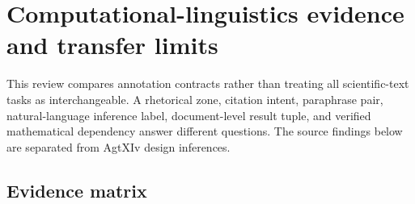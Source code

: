 \section{Computational-linguistics evidence and transfer limits}\label{sec:literature}

This review compares annotation contracts rather than treating all scientific-text tasks as interchangeable. A rhetorical zone, citation intent, paraphrase pair, natural-language inference label, document-level result tuple, and verified mathematical dependency answer different questions. The source findings below are separated from AgtXIv design inferences.

\subsection{Evidence matrix}


